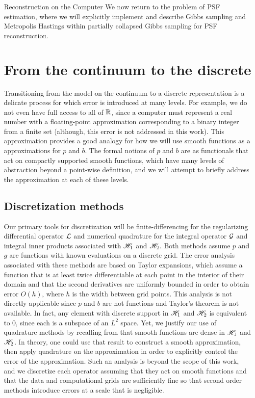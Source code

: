 \begin{chapter}{Reconstruction on the Computer}
We now return to the problem of PSF estimation, where we will explicitly implement and describe Gibbs sampling and Metropolis Hastings within partially collapsed Gibbs sampling for PSF reconstruction.

\section{From the continuum to the discrete} \label{sec:discretization}

Transitioning from the model on the continuum to a discrete representation is a delicate process for which error is introduced at many levels.  
For example, we do not even have full access to all of $\mathbb R$, since a computer must represent a real number with a floating-point approximation corresponding to a binary integer from a finite set (although, this error is not addressed in this work). 
This approximation provides a good analogy for how we will use smooth functions as a approximations for $p$ and $b$.
The formal notions of $p$ and $b$ are as functionals that act on compactly supported smooth functions, which have many levels of abstraction beyond a point-wise definition, and we will attempt to briefly address the approximation at each of these levels.

\subsection{Discretization methods}
Our primary tools for discretization will be finite-differencing for the regularizing differential operator $\mathcal L$ and numerical quadrature for the integral operator $\mathcal G$ and integral inner products associated with $\mathscr H_1$ and $\mathscr H_2$.
Both methods assume $p$ and $g$ are functions with known evaluations on a discrete grid.
The error analysis associated with these methods are based on Taylor expansions, which assume a function that is at least twice differentiable at each point in the interior of their domain and that the second derivatives are uniformly bounded in order to obtain error $O(h)$, where $h$ is the width between grid points.
This analysis is not directly applicable since $p$ and $b$ are not functions and Taylor's theorem is not available.
In fact, any element with discrete support in $\mathscr H_1$ and $\mathscr H_2$ is equivalent to $0$, since each is a subspace of an $L^2$ space.
Yet, we justify our use of quadrature methods by recalling from  that smooth functions are dense in $\mathscr H_1$ and $\mathscr H_2$.
In theory, one could use that result to construct a smooth approximation, then apply quadrature on the approximation in order to explicitly control the error of the approximation.
Such an analysis is beyond the scope of this work, and we discretize each operator assuming that they act on smooth functions and that the data and computational grids are sufficiently fine so that second order methods introduce errors at a scale that is negligible.


\end{chapter}
